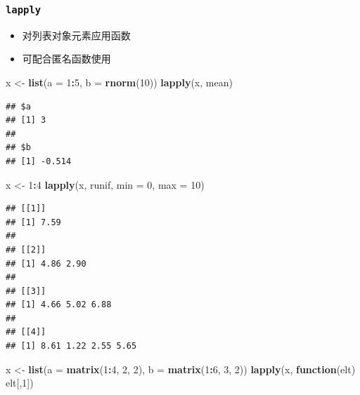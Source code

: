 \documentclass[]{book}
\newenvironment{Shaded}{\begin{snugshade}}{\end{snugshade}}
\newcommand{\ControlFlowTok}[1]{\textcolor[rgb]{0.13,0.29,0.53}{\textbf{#1}}}
\newcommand{\DataTypeTok}[1]{\textcolor[rgb]{0.13,0.29,0.53}{#1}}
\newcommand{\DecValTok}[1]{\textcolor[rgb]{0.00,0.00,0.81}{#1}}
\newcommand{\KeywordTok}[1]{\textcolor[rgb]{0.13,0.29,0.53}{\textbf{#1}}}
\newcommand{\NormalTok}[1]{#1}
\newcommand{\OperatorTok}[1]{\textcolor[rgb]{0.81,0.36,0.00}{\textbf{#1}}}
\newcommand{\StringTok}[1]{\textcolor[rgb]{0.31,0.60,0.02}{#1}}
\providecommand{\tightlist}{%
  \setlength{\itemsep}{0pt}\setlength{\parskip}{0pt}}
\begin{document}
\hypertarget{lapply}{%
\subsubsection{\texorpdfstring{\texttt{lapply}}{lapply}}\label{lapply}}

\begin{itemize}
\tightlist
\item
  对列表对象元素应用函数
\item
  可配合匿名函数使用
\end{itemize}

\begin{Shaded}
\begin{Highlighting}[]
\NormalTok{x <-}\StringTok{ }\KeywordTok{list}\NormalTok{(}\DataTypeTok{a =} \DecValTok{1}\OperatorTok{:}\DecValTok{5}\NormalTok{, }\DataTypeTok{b =} \KeywordTok{rnorm}\NormalTok{(}\DecValTok{10}\NormalTok{))}
\KeywordTok{lapply}\NormalTok{(x, mean)}
\end{Highlighting}
\end{Shaded}

\begin{verbatim}
## $a
## [1] 3
## 
## $b
## [1] -0.514
\end{verbatim}

\begin{Shaded}
\begin{Highlighting}[]
\NormalTok{x <-}\StringTok{ }\DecValTok{1}\OperatorTok{:}\DecValTok{4}
\KeywordTok{lapply}\NormalTok{(x, runif, }\DataTypeTok{min =} \DecValTok{0}\NormalTok{, }\DataTypeTok{max =} \DecValTok{10}\NormalTok{)}
\end{Highlighting}
\end{Shaded}

\begin{verbatim}
## [[1]]
## [1] 7.59
## 
## [[2]]
## [1] 4.86 2.90
## 
## [[3]]
## [1] 4.66 5.02 6.88
## 
## [[4]]
## [1] 8.61 1.22 2.55 5.65
\end{verbatim}

\begin{Shaded}
\begin{Highlighting}[]
\NormalTok{x <-}\StringTok{ }\KeywordTok{list}\NormalTok{(}\DataTypeTok{a =} \KeywordTok{matrix}\NormalTok{(}\DecValTok{1}\OperatorTok{:}\DecValTok{4}\NormalTok{, }\DecValTok{2}\NormalTok{, }\DecValTok{2}\NormalTok{), }\DataTypeTok{b =} \KeywordTok{matrix}\NormalTok{(}\DecValTok{1}\OperatorTok{:}\DecValTok{6}\NormalTok{, }\DecValTok{3}\NormalTok{, }\DecValTok{2}\NormalTok{))}
\KeywordTok{lapply}\NormalTok{(x, }\ControlFlowTok{function}\NormalTok{(elt) elt[,}\DecValTok{1}\NormalTok{])}
\end{Highlighting}
\end{Shaded}
\end{document}
